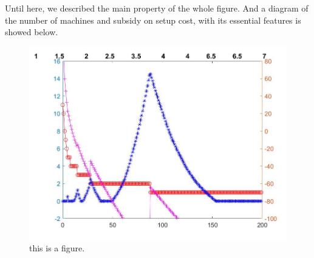 \documentclass[UTF8]{article}
\begin{document}
Until here, we described the main property of the whole figure.
And a diagram of the number of machines and subsidy on setup cost, with its essential features is showed below.

\begin{figure}[h]%
	\centering  %
	\includegraphics[width=0.7\linewidth]{Figures/Image30}  %
	\caption{this is a figure.}  %
	\label{fig:mcmthesis-logo}   %
\end{figure}
\end{document}
